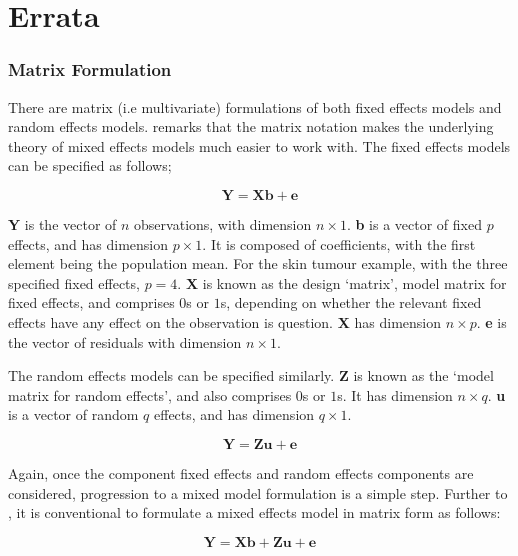 \documentclass[12pt, a4paper]{report}
\theoremstyle{plain}
\theoremstyle{definition}
\theoremstyle{remark}
\begin{document}
\chapter{Errata}








\subsection{Matrix Formulation} There are matrix (i.e multivariate)
formulations of both fixed effects models and random effects
models. \citet{BrownPrescott} remarks that the matrix notation
makes the underlying theory of mixed effects models much easier to
work with. The fixed effects models can be specified as follows;

\begin{equation}
\textbf{Y} = \textbf{Xb} + \textbf{e}
\end{equation}

\textbf{Y} is the vector of $n$ observations, with dimension $n
\times 1$. \textbf{b} is a vector of fixed $p$ effects, and has
dimension $p \times 1$. It is composed of coefficients, with the
first element being the population mean. For the skin tumour
example, with the three specified fixed effects, $p=4$. \textbf{X}
is known as the design `matrix', model matrix for fixed effects,
and comprises $0$s or $1$s, depending on whether the relevant
fixed effects have any effect on the observation is question.
\textbf{X} has dimension $n \times p$. \textbf{e} is the vector of
residuals with dimension $n \times 1$.

The random effects models can be specified similarly. \textbf{Z}
is known as the `model matrix for random effects', and also
comprises $0$s or $1$s. It has dimension $n \times q$. \textbf{u}
is a vector of random $q$ effects, and has dimension $q \times 1$.

\begin{equation}
\textbf{Y} = \textbf{Zu} + \textbf{e}
\end{equation}

Again, once the component fixed effects and random effects
components are considered, progression to a mixed model
formulation is a simple step. Further to \citet{LW82}, it is
conventional to formulate a mixed effects model in matrix form as
follows:

\begin{equation}
\textbf{Y} = \textbf{Xb} + \textbf{Zu} + \textbf{e}
\end{equation}
\end{document}
